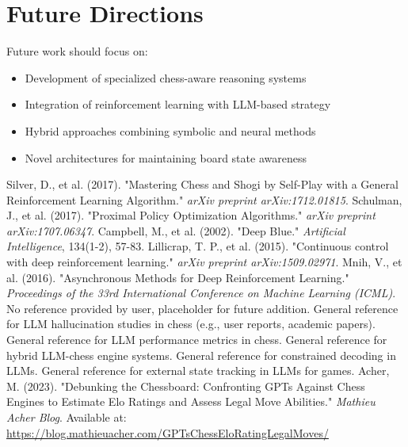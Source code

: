 \documentclass[12pt,a4paper]{report}
\begin{document}
\section{Future Directions}
Future work should focus on:
\begin{itemize}
    \item Development of specialized chess-aware reasoning systems
    \item Integration of reinforcement learning with LLM-based strategy
    \item Hybrid approaches combining symbolic and neural methods
    \item Novel architectures for maintaining board state awareness
\end{itemize}

\begin{thebibliography}{00}
 Silver, D., et al. (2017). "Mastering Chess and Shogi by Self-Play with a General Reinforcement Learning Algorithm." \textit{arXiv preprint arXiv:1712.01815}.
 Schulman, J., et al. (2017). "Proximal Policy Optimization Algorithms." \textit{arXiv preprint arXiv:1707.06347}.
 Campbell, M., et al. (2002). "Deep Blue." \textit{Artificial Intelligence}, 134(1-2), 57-83.
 Lillicrap, T. P., et al. (2015). "Continuous control with deep reinforcement learning." \textit{arXiv preprint arXiv:1509.02971}.
 Mnih, V., et al. (2016). "Asynchronous Methods for Deep Reinforcement Learning." \textit{Proceedings of the 33rd International Conference on Machine Learning (ICML)}.
 No reference provided by user, placeholder for future addition.
 General reference for LLM hallucination studies in chess (e.g., user reports, academic papers).
 General reference for LLM performance metrics in chess.
 General reference for hybrid LLM-chess engine systems.
 General reference for constrained decoding in LLMs.
 General reference for external state tracking in LLMs for games.
 Acher, M. (2023). "Debunking the Chessboard: Confronting GPTs Against Chess Engines to Estimate Elo Ratings and Assess Legal Move Abilities." \textit{Mathieu Acher Blog}. Available at: \url{https://blog.mathieuacher.com/GPTsChessEloRatingLegalMoves/}
\end{thebibliography}
\end{document}

